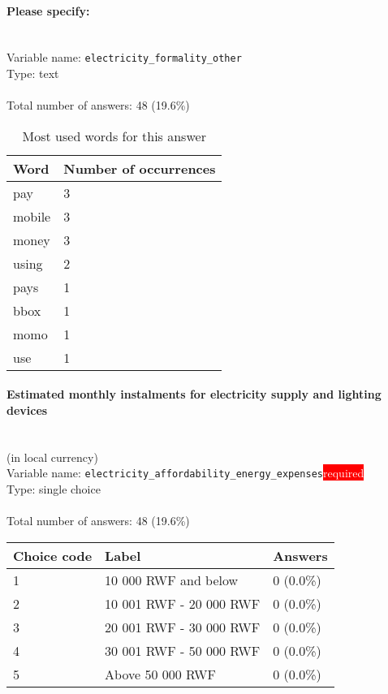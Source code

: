 \documentclass[11.5pt, a4paper]{scrartcl}
\begin{document}
\paragraph{Please specify:}
\  \\Variable name: \texttt{electricity\_formality\_other}\\
Type: text\\
\\Total number of answers: 48 (19.6\%)
\\[0.2em]\begin{table}[H]
 \begin{tabular}{p{4cm}|p{8cm}}
Word & Number of occurrences  \\
\hline
\cellcolor{mygray}pay&\cellcolor{mygray}3\\
\hline
mobile&3\\
\hline
\cellcolor{mygray}money&\cellcolor{mygray}3\\
\hline
using&2\\
\hline
\cellcolor{mygray}pays&\cellcolor{mygray}1\\
\hline
bbox&1\\
\hline
\cellcolor{mygray}momo&\cellcolor{mygray}1\\
\hline
use&1\\
\hline
\end{tabular}
\caption{\label{tab:table-name} Most used words for this answer}
\end{table}
\paragraph{Estimated monthly instalments for electricity supply and lighting devices}
\ \\ {\small (in local currency)}
\  \\Variable name: \texttt{electricity\_affordability\_energy\_expenses}\hfill\colorbox{red}{\small{\textcolor{white}{required}}}\\
 Type: single choice\\
\\Total number of answers: 48 (19.6\%)
\\[0.2em] \begin{tabular}{p{4cm}|p{8cm}|p{3cm}}
Choice code & Label & Answers \\
\hline
1 & 10 000 RWF and below& \cellcolor{color0}0 (0.0\%)\\
\cellcolor{mygray} 2 & \cellcolor{mygray}10 001 RWF - 20 000 RWF & \cellcolor{color0}0 (0.0\%)\\
3 & 20 001 RWF - 30 000 RWF& \cellcolor{color0}0 (0.0\%)\\
\cellcolor{mygray} 4 & \cellcolor{mygray}30 001 RWF - 50 000 RWF & \cellcolor{color0}0 (0.0\%)\\
5 & Above 50 000 RWF& \cellcolor{color0}0 (0.0\%)\\
\end{tabular}
\end{document}

